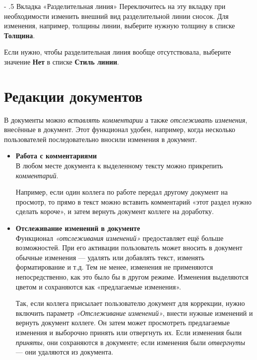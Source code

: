 ﻿\documentclass[a4paper,10pt]{article}
\makeatletter
\renewcommand\paragraph{%
   \@startsection{paragraph}{4}{0mm}%
      {-\baselineskip}%
      {.5\baselineskip}%
      {\normalfont\normalsize\bfseries}}
\makeatother
\begin{document}
\paragraph{Вкладка «Разделительная линия»}
Переключитесь на эту вкладку при необходимости изменить внешний вид разделительной линии сносок. Для изменения, например, толщины линии, выберите нужную толщину в списке \textbf{Толщина}.

Если нужно, чтобы разделительная линия вообще отсутствовала, выберите значение \textbf{Нет} в списке \textbf{Стиль линии}.

\section{Редакции документов} \label{sec:редакциидокументов}
В документы можно \textit{вставлять комментарии} а также \textit{отслеживать изменения}, внесённые в документ. Этот функционал удобен, например, когда несколько пользователей последовательно вносили изменения в документ.

\begin{itemize}
 \item \textbf{Работа с комментариями}\\
 В любом месте документа к выделенному тексту можно прикрепить \textit{комментарий}.
 
 Например, если один коллега по работе передал другому документ на просмотр, то прямо в текст можно вставить комментарий «этот раздел нужно сделать короче», и затем вернуть документ коллеге на доработку.
 \item \textbf{Отслеживание изменений в документе}\\
 Функционал \textit{«отслеживания изменений»} предоставляет ещё больше возможностей. При его активации пользователь может вносить в документ обычные изменения — удалять или добавлять текст, изменять форматирование и т.д. Тем не менее, изменения не применяются непосредственно, как это было бы в другом режиме. Изменения выделяются цветом и сохраняются как «предлагаемые изменения».
 
 Так, если коллега присылает пользователю документ для коррекции, нужно включить параметр \textit{«Отслеживание изменений»}, внести нужные изменений и вернуть документ коллеге. Он затем может просмотреть предлагаемые изменения и выборочно принять или отвергнуть их. Если изменения были \textit{приняты}, они сохраняются в документе; если изменения были \textit{отвергнуты} — они удаляются из документа.
 \end{itemize}
 
\end{document}
